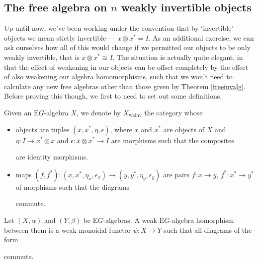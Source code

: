 \documentclass{amsart} %
\newenvironment{eq*}{\begin{equation*}}{\end{equation*}}
\begin{document}
\subsection{The free algebra on $n$ weakly invertible objects}

Up until now, we've been working under the convention that by `invertible' objects we mean stictly invertible --- $x \otimes x^* = I$. As an additional exercise, we can ask ourselves how all of this would change if we permitted our objects to be only weakly invertible, that is $x \otimes x^* \cong I$. The situation is actually quite elegant, in that the effect of weakening in our objects can be offset completely by the effect of also weakening our algebra homomorphisms, such that we won't need to calculate any new free algebras other than those given by Theorem \ref{freeinvalg}. Before proving this though, we first to need to set out some definitions.

\begin{defi} Given an $\mathrm{E}G$-algebra $X$, we denote by $X_{\mathrm{wkinv}}$ the category whose
\begin{itemize}
\item objects are tuples $(x, x^*, \eta, \epsilon)$, where $x$ and $x^*$ are objects of $X$ and $\eta: I \to x^* \otimes x$ and $\epsilon : x \otimes x^* \to I$ are morphisms such that the composites
\begin{eq*} 
\end{eq*}
are identity morphisms.
\item maps $(f, f^*): (x, x^*, \eta_x, \epsilon_x) \to (y, y^*, \eta_y, \epsilon_y)$ are pairs $f: x \to y$, $f^* : x^* \to y^*$ of morphisms such that the diagrams
\begin{eq*} 
\end{eq*}
commute.
\end{itemize}
\end{defi}

\begin{defi}\label{weakmonfunc} Let $(X, \alpha)$ and $(Y, \beta)$ be $\mathrm{E}G$-algebras. A weak $\mathrm{E}G$-algebra homorphism between them is a weak monoidal functor $\psi: X \to Y$ such that all diagrams of the form
\begin{eq*} 
\end{eq*}
commute.
\end{defi}
\end{document}
